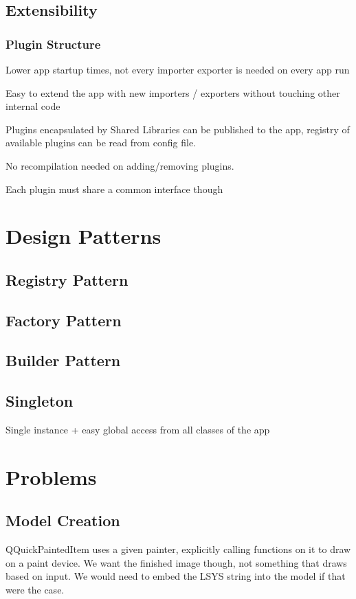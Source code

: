 \subsection{Extensibility}
\subsubsection{Plugin Structure}
Lower app startup times, not every importer exporter is needed on every app run

Easy to extend the app with new importers / exporters without touching other internal code

Plugins encapsulated by Shared Libraries can be published to the app, registry of available plugins can be read from config file.

No recompilation needed on adding/removing plugins.

Each plugin must share a common interface though

\section{Design Patterns}
\subsection{Registry Pattern}

\subsection{Factory Pattern}

\subsection{Builder Pattern}

\subsection{Singleton}
Single instance + easy global access from all classes of the app


\section{Problems}
\subsection{Model Creation}
QQuickPaintedItem uses a given painter, explicitly calling functions on it to draw on a paint device.
We want the finished image though, not something that draws based on input. We would need to embed the LSYS string into the model if that were the case.

